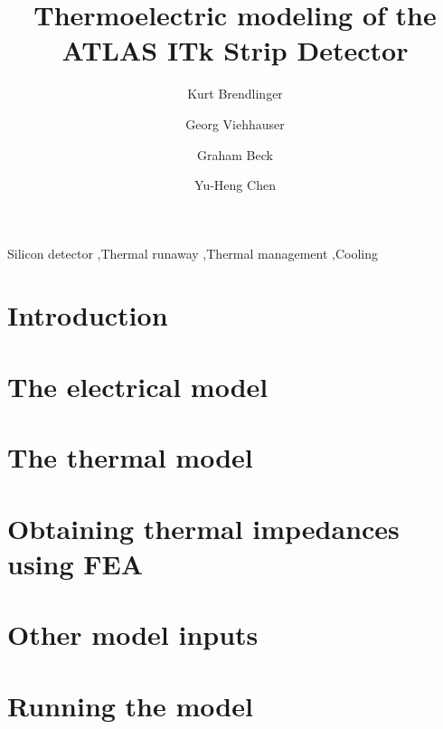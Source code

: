 \documentclass[preprint]{elsarticle/elsarticle}
\begin{document}
\begin{frontmatter}

\title{Thermoelectric modeling of the ATLAS ITk Strip Detector}
\author[1]{Kurt Brendlinger} %
\author[2]{Georg Viehhauser} %
\author[3]{Graham Beck}      %
\author[4]{Yu-Heng Chen}     %
\address{}

\begin{abstract}

\end{abstract}

\begin{keyword}
Silicon detector \sep Thermal runaway \sep Thermal management \sep Cooling
\end{keyword}

\end{frontmatter}

\section{Introduction}


\section{The electrical model}


\section{The thermal model}


\section{Obtaining thermal impedances using FEA}


\section{Other model inputs}


\section{Running the model}

\end{document}
